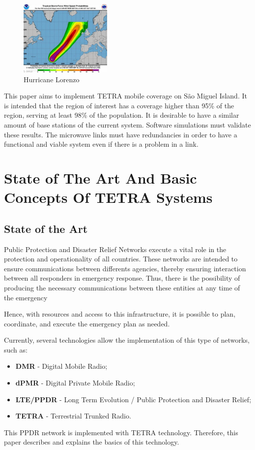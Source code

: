 \documentclass[letterpaper, 10 pt, conference]{ieeeconf}  %
\begin{document}
\begin{figure}[ht]
    \centering
    \includegraphics[width=0.4\textwidth]{Lorenzo.jpg}
    \caption{Hurricane Lorenzo}
    \label{fig:lorenzo}
\end{figure}
This paper aims to implement TETRA mobile coverage on São Miguel Island. It is intended that the region of interest has a coverage higher than 95\% of the region, serving at least 98\% of the population. It is desirable to have a similar amount of base stations of the current system. Software simulations must validate these results. The microwave links must have redundancies in order to have a functional and viable system even if there is a problem in a link.
\section{State of The Art And Basic Concepts Of TETRA Systems}

\subsection{State of the Art}

Public Protection and Disaster Relief Networks execute a vital role in the protection and operationality of all countries. These networks are intended to ensure communications between differents agencies, thereby ensuring interaction between all responders in emergency response. Thus, there is the possibility of producing the necessary communications between these entities at any time of the emergency\par\noindent
Hence, with resources and access to this infrastructure, it is possible to plan, coordinate, and execute the emergency plan as needed.\par\noindent
Currently, several technologies allow the implementation of this type of networks, such as:
\begin{itemize}
    \item \textbf{DMR} - Digital Mobile Radio;
    \item \textbf{dPMR} - Digital Private Mobile Radio;
    \item \textbf{LTE/PPDR} - Long Term Evolution / Public Protection and Disaster Relief;
    \item \textbf{TETRA} - Terrestrial Trunked Radio.
\end{itemize}
\par\noindent
This PPDR network is implemented with TETRA technology. Therefore, this paper describes and explains the basics of this technology. %
\end{document}
